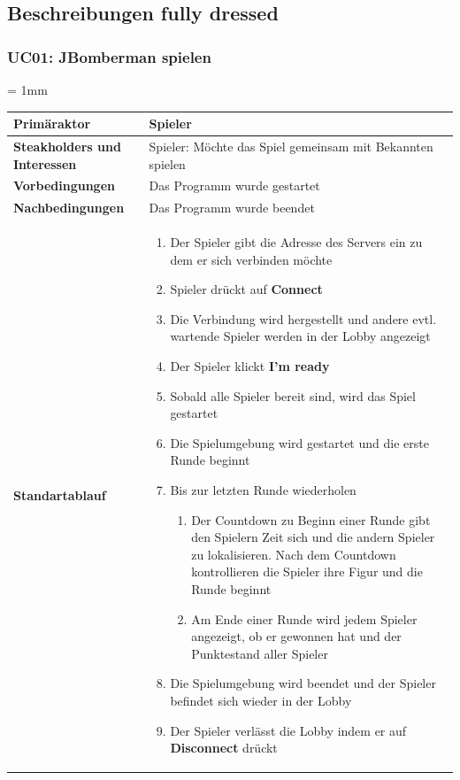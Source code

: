 \documentclass[11pt]{scrartcl}
\begin{document}
\newpage
\subsection{Beschreibungen fully dressed}
\label{sec:Beschreibungen full dressd}

\subsubsection{UC01: JBomberman spielen}
\label{sec:UC01: JBomberman spielen}
\belowtabulinesep = 1mm
\begin{longtabu} to \textwidth {X[1,l] X[2,l]}
	\bfseries Primäraktor & Spieler  \\\hline 
	\bfseries Steakholders und Interessen & Spieler: Möchte das Spiel gemeinsam mit Bekannten spielen  \\\hline 
	\bfseries Vorbedingungen & Das Programm wurde gestartet  \\\hline 
	\bfseries Nachbedingungen & Das Programm wurde beendet  \\\hline 
	\bfseries Standartablauf & 
		\begin{enumerate}
			\item Der Spieler gibt die Adresse des Servers ein zu dem er sich verbinden möchte
			\item Spieler drückt auf \textbf{Connect}
			\item Die Verbindung wird hergestellt und andere evtl. wartende Spieler werden in der Lobby angezeigt
			\item Der Spieler klickt \textbf{I'm ready}
			\item Sobald alle Spieler bereit sind, wird das Spiel gestartet
			\item Die Spielumgebung wird gestartet und die erste Runde beginnt
			\item Bis zur letzten Runde wiederholen
			\begin{enumerate}
				\item Der Countdown zu Beginn einer Runde gibt den Spielern Zeit sich und die andern Spieler zu lokalisieren. Nach dem Countdown kontrollieren die Spieler ihre Figur und die Runde beginnt
				\item Am Ende einer Runde wird jedem Spieler angezeigt, ob er gewonnen hat und der Punktestand aller Spieler
			\end{enumerate}
			\item Die Spielumgebung wird beendet und der Spieler befindet sich wieder in der Lobby
			\item Der Spieler verlässt die Lobby indem er auf \textbf{Disconnect} drückt

\end{enumerate}
\end{longtabu}
\end{document}
